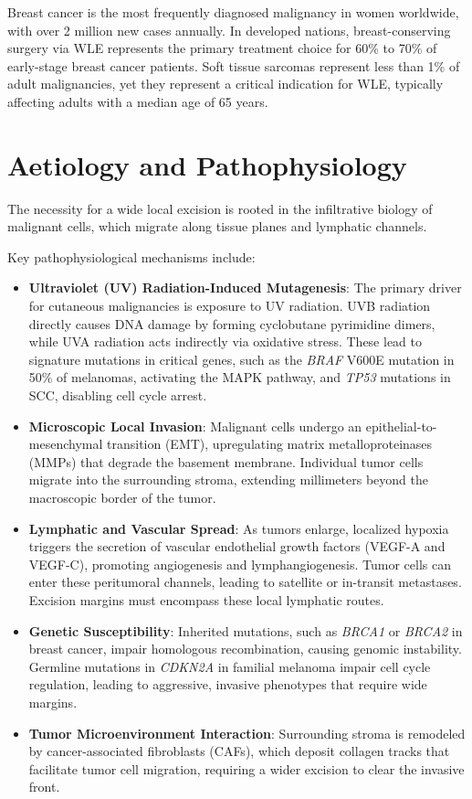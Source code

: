 Breast cancer is the most frequently diagnosed malignancy in women worldwide, with over 2 million new cases annually. In developed nations, breast-conserving surgery via WLE represents the primary treatment choice for 60\% to 70\% of early-stage breast cancer patients. Soft tissue sarcomas represent less than 1\% of adult malignancies, yet they represent a critical indication for WLE, typically affecting adults with a median age of 65 years.

\section*{Aetiology and Pathophysiology}
The necessity for a wide local excision is rooted in the infiltrative biology of malignant cells, which migrate along tissue planes and lymphatic channels.

Key pathophysiological mechanisms include:
\begin{itemize}
    \item \textbf{Ultraviolet (UV) Radiation-Induced Mutagenesis}: The primary driver for cutaneous malignancies is exposure to UV radiation. UVB radiation directly causes DNA damage by forming cyclobutane pyrimidine dimers, while UVA radiation acts indirectly via oxidative stress. These lead to signature mutations in critical genes, such as the \textit{BRAF} V600E mutation in 50\% of melanomas, activating the MAPK pathway, and \textit{TP53} mutations in SCC, disabling cell cycle arrest.
    \item \textbf{Microscopic Local Invasion}: Malignant cells undergo an epithelial-to-mesenchymal transition (EMT), upregulating matrix metalloproteinases (MMPs) that degrade the basement membrane. Individual tumor cells migrate into the surrounding stroma, extending millimeters beyond the macroscopic border of the tumor.
    \item \textbf{Lymphatic and Vascular Spread}: As tumors enlarge, localized hypoxia triggers the secretion of vascular endothelial growth factors (VEGF-A and VEGF-C), promoting angiogenesis and lymphangiogenesis. Tumor cells can enter these peritumoral channels, leading to satellite or in-transit metastases. Excision margins must encompass these local lymphatic routes.
    \item \textbf{Genetic Susceptibility}: Inherited mutations, such as \textit{BRCA1} or \textit{BRCA2} in breast cancer, impair homologous recombination, causing genomic instability. Germline mutations in \textit{CDKN2A} in familial melanoma impair cell cycle regulation, leading to aggressive, invasive phenotypes that require wide margins.
    \item \textbf{Tumor Microenvironment Interaction}: Surrounding stroma is remodeled by cancer-associated fibroblasts (CAFs), which deposit collagen tracks that facilitate tumor cell migration, requiring a wider excision to clear the invasive front.
\end{itemize}

